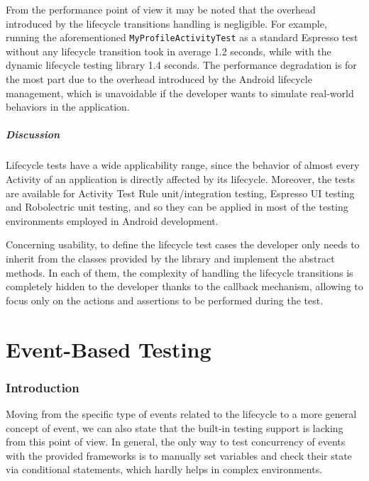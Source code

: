 \documentclass[11pt,a4paper,notitlepage]{article}
\begin{document}
From the performance point of view it may be noted that the overhead introduced by the lifecycle transitions handling is negligible. For example, running  the aforementioned \texttt{MyProfileActivityTest} as a standard Espresso test without any lifecycle transition took in average 1.2 seconds, while with the dynamic lifecycle testing library 1.4 seconds. The performance degradation is for the most part due to the overhead introduced by the Android lifecycle management, which is unavoidable if the developer wants to simulate real-world behaviors in the application.

\subsubsection{Discussion}
Lifecycle tests have a wide applicability range, since the behavior of almost every Activity of an application is directly affected by its lifecycle. Moreover, the tests are available for Activity Test Rule unit/integration testing, Espresso UI testing and Robolectric unit testing, and so they can be applied in most of the testing environments employed in Android development.

Concerning usability, to define the lifecycle test cases the developer only needs to inherit from the classes provided by the library and implement the abstract methods. In each of them, the complexity of handling the lifecycle transitions is completely hidden to the developer thanks to the callback mechanism, allowing to focus only on the actions and assertions to be performed during the test.



\newpage
\part{Event-Based Testing}\label{part_events}

\section{Introduction}
Moving from the specific type of events related to the lifecycle to a more general concept of event, we can also state that the built-in testing support is lacking from this point of view. In general, the only way to test concurrency of events with the provided frameworks is to manually set variables and check their state via conditional statements, which hardly helps in complex environments.
\end{document}
